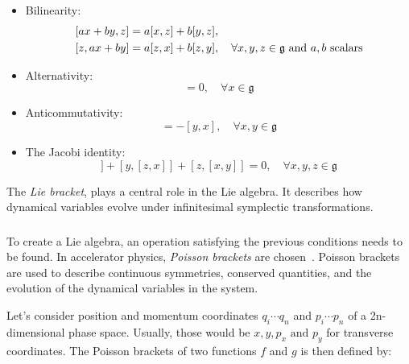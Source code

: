 \begin{itemize}
    \item Bilinearity:
    \begin{equation}
        \begin{aligned}
        \relax[ax+by, z] &= a[x,z] + b[y,z], \\
        [z, ax+by] &= a[z,x] + b[z,y], \quad \forall x,y,z \in \mathfrak{g}~\text{and}~a,b~\text{scalars}
        \label{eq:coordinates:bilinearity}
        \end{aligned}
    \end{equation}

    \item Alternativity:
    \begin{equation}
        [x,x] = 0, \quad \forall x \in \mathfrak{g}
    \end{equation}

    \item Anticommutativity:
    \begin{equation}
        [x,y] = -[y,x], \quad \forall x,y \in \mathfrak{g}
    \end{equation}

    \item The Jacobi identity:
    \begin{equation}
        [x,[y,z]] + [y, [z,x]] + [z, [x,y]] = 0, \quad \forall x,y,z \in \mathfrak{g}
        \label{eq:coordinates:jacobi_identity}
    \end{equation}
\end{itemize}

The \textit{Lie bracket}, plays a central role in the Lie algebra. It describes how dynamical
variables evolve under infinitesimal symplectic transformations.


\subsubsection{}

To create a Lie algebra, an operation satisfying the previous conditions needs to be found. In
accelerator physics, \textit{Poisson brackets} are
chosen~\cite{dragt_overview_2013,roy_analysis_1992}. Poisson brackets are used to describe 
continuous symmetries, conserved quantities, and the evolution of the dynamical variables in the
system.

Let's
consider position and momentum coordinates $q_i \cdots q_n$ and $p_i \cdots p_n$  of a
2n-dimensional phase space. Usually, those would be $x, y, p_x \text{ and } p_y$ for transverse
coordinates. The Poisson brackets of two functions $f$ and $g$ is then defined by:

